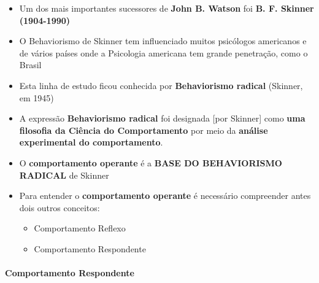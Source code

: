 \documentclass[
]{book}
\providecommand{\tightlist}{%
  \setlength{\itemsep}{0pt}\setlength{\parskip}{0pt}}
\begin{document}
\begin{itemize}
\tightlist
\item
  Um dos mais importantes sucessores de \textbf{John B. Watson} foi
  \textbf{B. F. Skinner (1904-1990)}
\item
  O Behaviorismo de Skinner tem influenciado muitos psicólogos
  americanos e de vários países onde a Psicologia americana tem grande
  penetração, como o Brasil
\item
  Esta linha de estudo ficou conhecida por \textbf{Behaviorismo radical}
  (Skinner, em 1945)
\item
  A expressão \textbf{Behaviorismo radical} foi designada {[}por
  Skinner{]} como \textbf{uma filosofia da Ciência do Comportamento} por
  meio da \textbf{análise experimental do comportamento}.
\item
  O \textbf{comportamento operante} é a \textbf{BASE DO BEHAVIORISMO
  RADICAL} de Skinner
\item
  Para entender o \textbf{comportamento operante} é necessário
  compreender antes dois outros conceitos:

  \begin{itemize}
  \tightlist
  \item
    Comportamento Reflexo
  \item
    Comportamento Respondente
  \end{itemize}
\end{itemize}

\hypertarget{comportamento-respondente}{%
\paragraph{Comportamento Respondente}\label{comportamento-respondente}}
\end{document}
